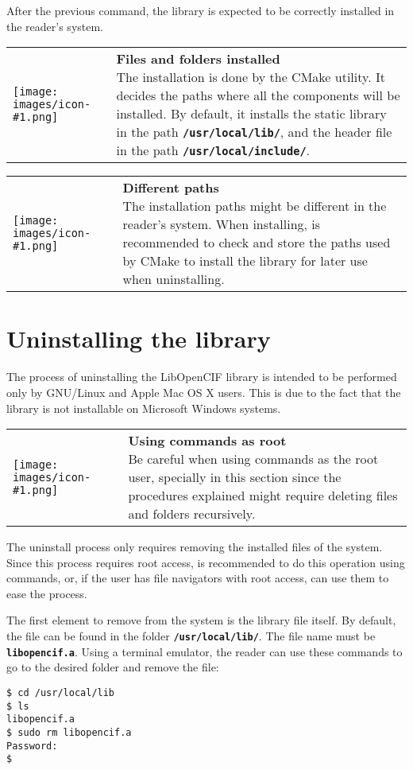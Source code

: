 \documentclass[11pt,twoside,openany,x11names,svgnames]{memoir}
\makeatletter
\newcommand{\IconNote}[3]
{
	\begin{table}[ht]
	\begin{tabular}{ lm{\dimexpr\textwidth-8\tabcolsep-\wd0}@{}}
		\toprule
		\texttt{[image: images/icon-\#1.png]}
		&
		\parbox[t]{155mm}{
		\textbf{#2} \\
		#3
		}
	\end{tabular}
\end{table}
}
\makeatother
\begin{document}
After the previous command, the library is expected to be correctly installed in the reader's system.

\IconNote
	{info}
	{Files and folders installed}
	{The installation is done by the CMake utility. It decides the paths where all the components will be installed. By default, it installs the static library in the path \textbf{\texttt{/usr/local/lib/}}, and the header file in the path \textbf{\texttt{/usr/local/include/}}.}
	
\IconNote
	{info}
	{Different paths}
	{The installation paths might be different in the reader's system. When installing, is recommended to check and store the paths used by CMake to install the library for later use when uninstalling.}

\section{Uninstalling the library}\label{Uninstalling-the-library}

The process of uninstalling the LibOpenCIF library is intended to be performed only by GNU/Linux and Apple Mac OS X users. This is due to the fact that the library is not installable on Microsoft Windows systems.

\IconNote
	{error}
	{Using commands as root}
	{Be careful when using commands as the root user, specially in this section since the procedures explained might require deleting files and folders recursively.}

The uninstall process only requires removing the installed files of the system. Since this process requires root access, is recommended to do this operation using commands, or, if the user has file navigators with root access, can use them to ease the process.

The first element to remove from the system is the library file itself. By default, the file can be found in the folder \textbf{\texttt{/usr/local/lib/}}. The file name must be \textbf{\texttt{libopencif.a}}. Using a terminal emulator, the reader can use these commands to go to the desired folder and remove the file:

\begin{lstlisting}[frame=single,style=SystemCommandStyle]
$ cd /usr/local/lib
$ ls
libopencif.a
$ sudo rm libopencif.a
Password:
$
\end{lstlisting}
\end{document}
